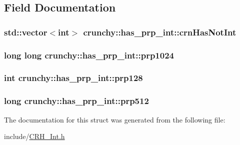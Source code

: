 \subsection{Field Documentation}
\hypertarget{structcrunchy_1_1has__prp__int_aad3a0422efea97f7b9bee027cfcb52db}{}
\subsubsection[{crn\+Has\+Not\+Int}]{\setlength{\rightskip}{0pt plus 5cm}std\+::vector$<$int$>$ crunchy\+::has\+\_\+prp\+\_\+int\+::crn\+Has\+Not\+Int}\label{structcrunchy_1_1has__prp__int_aad3a0422efea97f7b9bee027cfcb52db}
\hypertarget{structcrunchy_1_1has__prp__int_ace46d5f0b237274c2e320ce7c5a36d79}{}
\subsubsection[{prp1024}]{\setlength{\rightskip}{0pt plus 5cm}long long crunchy\+::has\+\_\+prp\+\_\+int\+::prp1024\hspace{0.3cm}{\ttfamily [static]}}\label{structcrunchy_1_1has__prp__int_ace46d5f0b237274c2e320ce7c5a36d79}
\hypertarget{structcrunchy_1_1has__prp__int_a0cd751991192d1399da3d87e53ee6107}{}
\subsubsection[{prp128}]{\setlength{\rightskip}{0pt plus 5cm}int crunchy\+::has\+\_\+prp\+\_\+int\+::prp128\hspace{0.3cm}{\ttfamily [static]}}\label{structcrunchy_1_1has__prp__int_a0cd751991192d1399da3d87e53ee6107}
\hypertarget{structcrunchy_1_1has__prp__int_a0d4a6dff87f95d843e28ea7370bef23f}{}
\subsubsection[{prp512}]{\setlength{\rightskip}{0pt plus 5cm}long crunchy\+::has\+\_\+prp\+\_\+int\+::prp512\hspace{0.3cm}{\ttfamily [static]}}\label{structcrunchy_1_1has__prp__int_a0d4a6dff87f95d843e28ea7370bef23f}


The documentation for this struct was generated from the following file\+:\begin{DoxyCompactItemize}
\item 
include/\hyperlink{_c_r_h___int_8h}{C\+R\+H\+\_\+\+Int.\+h}\end{DoxyCompactItemize}
